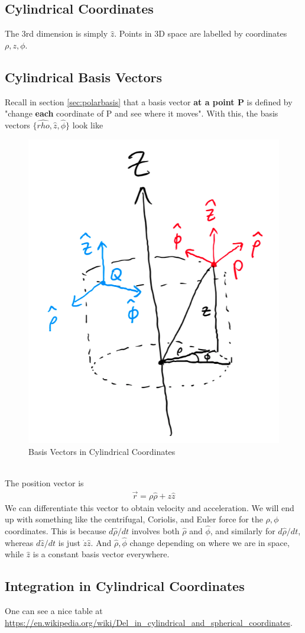 \documentclass{article}
\begin{document}
\subsection{Cylindrical Coordinates}
The 3rd dimension is simply $\hat{z}$. Points in 3D space are labelled by coordinates $\rho, z, \phi$. \\[10pt]
\subsection{Cylindrical Basis Vectors}
Recall in section \ref{sec:polarbasis} that a basis vector \textbf{at a point P} is defined by "change \textbf{each} coordinate of P and see where it moves". With this, the basis vectors $\{\hat{rho}, \hat{z}, \hat{\phi}\}$ look like
\begin{figure}[h]
    \centering
    \includegraphics[width=0.5\linewidth]{images/cylindricalbasis2.png}
    \caption{Basis Vectors in Cylindrical Coordinates}
    \label{fig:cylindricalbasis}
\end{figure}\\[10pt]
The position vector is 
\begin{align}
    \vec{r} = \rho \hat{\rho} + z \hat{z}
\end{align}
We can differentiate this vector to obtain velocity and acceleration. We will end up with something like the centrifugal, Coriolis, and Euler force for the $\rho, \phi$ coordinates. This is because ${d\hat{\rho}}/{dt}$ involves both $\hat{\rho}$ and $\hat{\phi}$, and similarly for ${d\hat{\rho}}/{dt}$, whereas $d\hat{z}/dt$ is just $\dot{z} \hat{z}$. And $\hat{\rho}, \hat{\phi}$ change depending on where we are in space, while $\hat{z}$ is a constant basis vector everywhere.
\subsection{Integration in Cylindrical Coordinates}
One can see a nice table at \url{https://en.wikipedia.org/wiki/Del_in_cylindrical_and_spherical_coordinates}.
\end{document}
